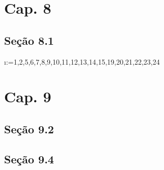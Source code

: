 \documentclass[letterpaper]{report}
\begin{document}
    \chapter*{Cap. 8}
    \section*{Seção 8.1}
    \makeatletter
    \@for\i:={1,2,5,6,7,8,9,10,11,12,13,14,15,19,20,21,22,23,24}%
    \makeatother

    \chapter*{Cap. 9}
    \section*{Seção 9.2}
    
    
    
    \section*{Seção 9.4}
    
\end{document}
